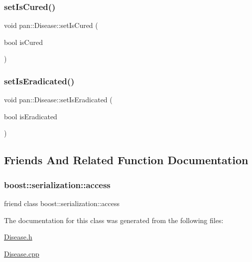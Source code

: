 \mbox{\label{classpan_1_1_disease_ac6363817626fee5081df5ff3c4be2b68}} 
\subsubsection{\texorpdfstring{set\+Is\+Cured()}{setIsCured()}}
{\footnotesize\ttfamily void pan\+::\+Disease\+::set\+Is\+Cured (\begin{DoxyParamCaption}\item[{bool}]{is\+Cured }\end{DoxyParamCaption})}

\mbox{\label{classpan_1_1_disease_a21c70c565e8a186f699696159231a767}} 
\subsubsection{\texorpdfstring{set\+Is\+Eradicated()}{setIsEradicated()}}
{\footnotesize\ttfamily void pan\+::\+Disease\+::set\+Is\+Eradicated (\begin{DoxyParamCaption}\item[{bool}]{is\+Eradicated }\end{DoxyParamCaption})}



\subsection{Friends And Related Function Documentation}
\mbox{\label{classpan_1_1_disease_ac98d07dd8f7b70e16ccb9a01abf56b9c}} 
\subsubsection{\texorpdfstring{boost\+::serialization\+::access}{boost::serialization::access}}
{\footnotesize\ttfamily friend class boost\+::serialization\+::access\hspace{0.3cm}{\ttfamily [friend]}}



The documentation for this class was generated from the following files\+:\begin{DoxyCompactItemize}
\item 
\hyperlink{_disease_8h}{Disease.\+h}\item 
\hyperlink{_disease_8cpp}{Disease.\+cpp}\end{DoxyCompactItemize}
